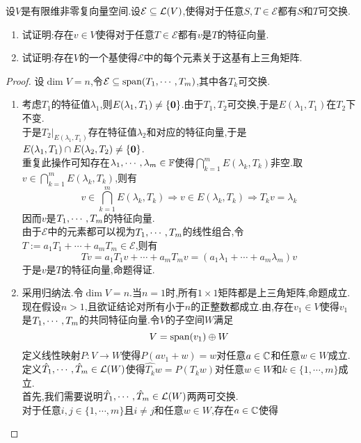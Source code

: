 \documentclass{ctexart}
\begin{document}
\begin{problem}[9.]
    设$V$是有限维非零复向量空间.设$\mathcal{E}\subseteq \mathcal{L}(V)$,使得对于任意$S,T\in\mathcal{E}$都有$S$和$T$可交换.
    \begin{enumerate}[label=\tbf{(\arabic*)}]
        \item 试证明:存在$v\in V$使得对于任意$T\in\mathcal{E}$都有$v$是$T$的特征向量.
        \item 试证明:存在$V$的一个基使得$\mathcal{E}$中的每个元素关于这基有上三角矩阵.
    \end{enumerate}
\end{problem}
\begin{proof}
    设$\dim V=n$,令$\mathcal{E}\subseteq\text{span}({T}_1,\cdots,{T}_{m})$,其中各$T_k$可交换.
    \begin{enumerate}[label=\tbf{(\arabic*)}]
        \item 考虑$T_1$的特征值$\lambda_1$,则$E(\lambda_1,T_1)\neq\{\mathbf0\}$.由于$T_1,T_2$可交换,于是$E(\lambda_1,T_1)$在$T_2$下不变.\\
            于是$T_2|_{E(\lambda_1,T_1)}$存在特征值$\lambda_2$和对应的特征向量,于是$E(\lambda_1,T_1)\cap E(\lambda_2,T_2)\neq\{\mathbf0\}$.\\
            重复此操作可知存在${\lambda}_1,\cdots,{\lambda}_{m}\in\mathbb{F}$使得$\displaystyle\bigcap_{k=1}^{m}E(\lambda_k,T_k)$非空.取$v\in\displaystyle\bigcap_{k=1}^{m}E(\lambda_k,T_k)$,则有
            \[v\in\bigcap_{k=1}^{m}E(\lambda_k,T_k)\Rightarrow v\in E(\lambda_k,T_k)\Rightarrow T_k v=\lambda_k\]
            因而$v$是${T}_1,\cdots,{T}_{m}$的特征向量.\\
            由于$\mathcal{E}$中的元素都可以视为${T}_1,\cdots,{T}_{m}$的线性组合,令$T:=a_1T_1+\cdots+a_mT_m\in\mathcal{E}$,则有
            \[Tv=a_1T_1v+\cdots+a_mT_mv=\left(a_1\lambda_1+\cdots+a_m\lambda_m\right)v\]
            于是$v$是$T$的特征向量,命题得证.
        \item 采用归纳法.令$\dim V=n$.当$n=1$时,所有$1\times 1$矩阵都是上三角矩阵,命题成立.\\
            现在假设$n>1$,且欲证结论对所有小于$n$的正整数都成立.由,存在$v_1\in V$使得$v_1$是${T}_1,\cdots,{T}_{m}$的共同特征向量.令$V$的子空间$W$满足
            \[V=\text{span}(v_1)\oplus W\]
            定义线性映射$P:V\to W$使得$P(av_1+w)=w$对任意$a\in\mathbb{C}$和任意$w\in W$成立.\\
            定义${\hat{T}}_1,\cdots,{\hat{T}}_{m}\in\mathcal{L}(W)$使得$\hat{T_k}w=P(T_kw)$对任意$w\in W$和$k\in\{1,\cdots,m\}$成立.\\
            首先,我们需要说明${\hat{T}}_1,\cdots,{\hat{T}}_{m}\in\mathcal{L}(W)$两两可交换.\\
            对于任意$i,j\in\{1,\cdots,m\}$且$i\neq j$和任意$w\in W$,存在$a\in\mathbb{C}$使得

\end{enumerate}
\end{proof}
\end{document}
